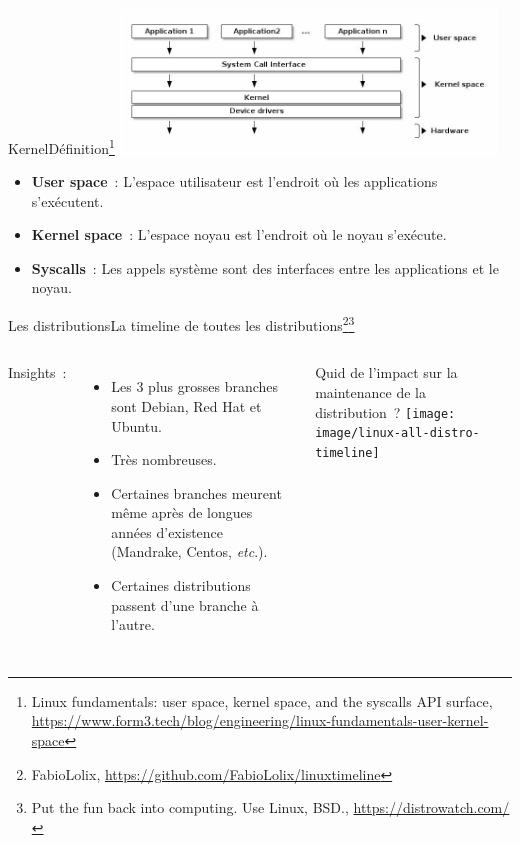 \documentclass{beamer}
\begin{document}
    \begin{frame}{Kernel}{Définition\footnote{Linux fundamentals: user space, kernel space, and the syscalls API surface, \url{https://www.form3.tech/blog/engineering/linux-fundamentals-user-kernel-space}}}
        \centering
        \includegraphics[width=10cm]{image/kernel}
        \flushleft
        \begin{itemize}
            \item \textbf{User space}~: L'espace utilisateur est l'endroit où les applications s'exécutent.
            \item \textbf{Kernel space}~: L'espace noyau est l'endroit où le noyau s'exécute.
            \item \textbf{Syscalls}~: Les appels système sont des interfaces entre les applications et le noyau.
        \end{itemize}
    \end{frame}

    \begin{frame}{Les distributions}{La timeline de toutes les distributions\footnote{FabioLolix, \url{https://github.com/FabioLolix/linuxtimeline}}\footnotestep\footnote{Put the fun back into computing. Use Linux, BSD., \url{https://distrowatch.com/}}}
        \begin{columns}
            Insights~:
            \begin{itemize}
                \item Les 3 plus grosses branches sont Debian, Red Hat et Ubuntu.
                \item Très nombreuses.
                \item Certaines branches meurent même après de longues années d'existence (Mandrake, Centos, \textit{etc}.).
                \item Certaines distributions passent d'une branche à l'autre.
            \end{itemize}
            Quid de l'impact sur la maintenance de la distribution~?
            \centering
            \texttt{[image: image/linux-all-distro-timeline]}
        \end{columns}
    \end{frame}
\end{document}
